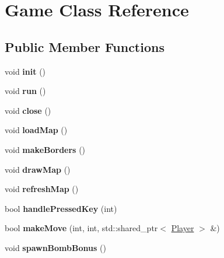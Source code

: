 \hypertarget{class_game}{}\section{Game Class Reference}
\label{class_game}
\subsection*{Public Member Functions}
\begin{DoxyCompactItemize}
\item 
\mbox{\label{class_game_a6f3a33940524b6ba9d83f627ccb14bbf}} 
void {\bfseries init} ()
\item 
\mbox{\label{class_game_a1ab78f5ed0d5ea879157357cf2fb2afa}} 
void {\bfseries run} ()
\item 
\mbox{\label{class_game_ad5133caa8447aadf71d6ba6c20d552bd}} 
void {\bfseries close} ()
\item 
\mbox{\label{class_game_ada8c449d8f734c2ad2e2ed292d4b787d}} 
void {\bfseries load\+Map} ()
\item 
\mbox{\label{class_game_ad7f22fa3f9e4bc206be4ef32c545b9a4}} 
void {\bfseries make\+Borders} ()
\item 
\mbox{\label{class_game_a0cfc647506542f877d8495596aa3ece1}} 
void {\bfseries draw\+Map} ()
\item 
\mbox{\label{class_game_a710b1a71a2a1f295e8f5cc1b48031d98}} 
void {\bfseries refresh\+Map} ()
\item 
\mbox{\label{class_game_a385999700fd4b4e4f47c6b41fe394499}} 
bool {\bfseries handle\+Pressed\+Key} (int)
\item 
\mbox{\label{class_game_a4f6ad0a49063725071071646f4761681}} 
bool {\bfseries make\+Move} (int, int, std\+::shared\+\_\+ptr$<$ \mbox{\hyperlink{class_player}{Player}} $>$ \&)
\item 
\mbox{\label{class_game_aa4d67f4480762a39cfa7734da8221a14}} 
void {\bfseries spawn\+Bomb\+Bonus} ()
\item 

\end{DoxyCompactItemize}

